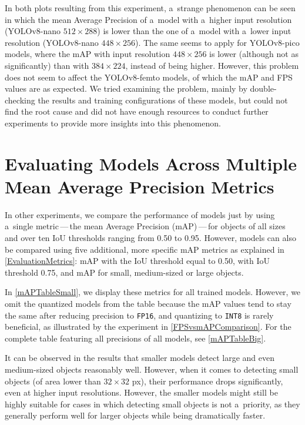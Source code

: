 In both plots resulting from this experiment, a~strange phenomenon can be seen
in which the mean Average Precision of a~model with a~higher input
resolution (YOLOv8-nano $512 \times 288$) is lower than the one of a~model
with a~lower input resolution (YOLOv8-nano $448 \times 256$). The same seems to apply for
YOLOv8-pico models, where the mAP with input resolution $448 \times 256$ is
lower (although not as significantly) than with $384 \times 224$, instead of
being higher. However, this problem does not seem to affect the YOLOv8-femto
models, of which the mAP and FPS values are as expected. We tried examining the
problem, mainly by double-checking the results and training configurations of
these models, but could not find the root cause and did not have enough
resources to conduct further experiments to provide more insights into this
phenomenon.


\section{Evaluating Models Across Multiple Mean Average Precision Metrics}

In other experiments, we compare the performance of models just by
using a~single metric\,---\,the mean Average Precision (mAP)\,---\,for objects of all
sizes and over ten IoU thresholds ranging from \num{0.50} to \num{0.95}.
However, models can also be compared using five additional, more specific mAP
metrics as explained in \autoref{EvaluationMetrics}: mAP with the IoU
threshold equal to \num{0.50}, with IoU threshold \num{0.75}, and mAP for small,
medium-sized or large objects.

In \autoref{mAPTableSmall}, we display these metrics for all trained models.
However, we omit the quantized models from the table because the mAP values tend
to stay the same after reducing precision to \texttt{FP16}, and quantizing to
\texttt{INT8} is rarely beneficial, as illustrated by the experiment in
\autoref{FPSvsmAPComparison}. For the complete table featuring all precisions of
all models, see \autoref{mAPTableBig}.

It can be observed in the results that smaller models detect large and even
medium-sized objects reasonably well. However, when it comes to detecting small
objects (of area lower than $32 \times 32$ px), their performance drops
significantly, even at higher input resolutions. However, the smaller models
might still be highly suitable for cases in which detecting small objects is not
a~priority, as they generally perform well for larger objects while being
dramatically faster.

